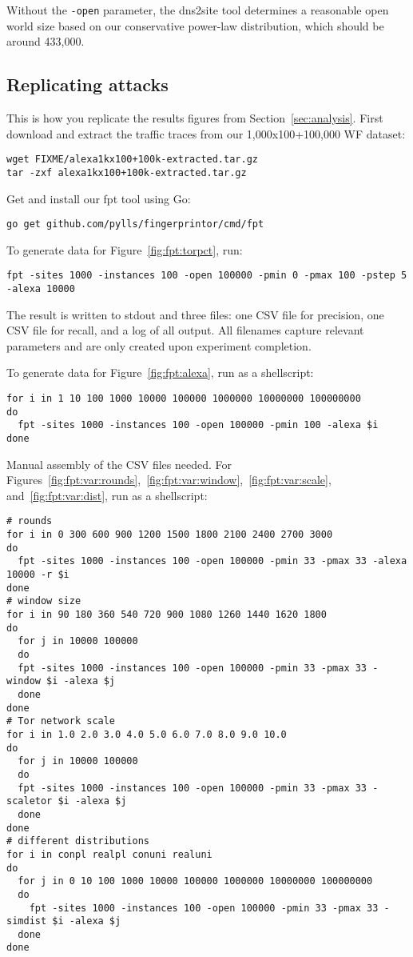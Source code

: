 Without the \texttt{-open} parameter, the dns2site tool determines a reasonable
open world size based on our conservative power-law distribution,
which should be around 433,000.

\subsection{Replicating \name attacks}
This is how you replicate the \name results figures from
Section~\ref{sec:analysis}.
First download and extract the traffic traces from our
1,000x100+100,000 WF dataset:

\begin{lstlisting}
wget FIXME/alexa1kx100+100k-extracted.tar.gz
tar -zxf alexa1kx100+100k-extracted.tar.gz
\end{lstlisting}

Get and install our fpt tool using Go:

\begin{lstlisting}
go get github.com/pylls/fingerprintor/cmd/fpt
\end{lstlisting}

To generate data for Figure~\ref{fig:fpt:torpct}, run:

\begin{lstlisting}
fpt -sites 1000 -instances 100 -open 100000 -pmin 0 -pmax 100 -pstep 5 -alexa 10000
\end{lstlisting}

The result is written to stdout and three files: one CSV file for precision,
one CSV file for recall, and a log of all output. All filenames capture relevant
parameters and are only created upon experiment completion.

To generate data for Figure~\ref{fig:fpt:alexa}, run as a shellscript:

\begin{lstlisting}
for i in 1 10 100 1000 10000 100000 1000000 10000000 100000000
do
  fpt -sites 1000 -instances 100 -open 100000 -pmin 100 -alexa $i
done
\end{lstlisting}

Manual assembly of the CSV files needed. For
Figures~\ref{fig:fpt:var:rounds},~\ref{fig:fpt:var:window},~\ref{fig:fpt:var:scale},
and~\ref{fig:fpt:var:dist}, run
as a shellscript:

\begin{lstlisting}
# rounds
for i in 0 300 600 900 1200 1500 1800 2100 2400 2700 3000
do
  fpt -sites 1000 -instances 100 -open 100000 -pmin 33 -pmax 33 -alexa 10000 -r $i
done
# window size
for i in 90 180 360 540 720 900 1080 1260 1440 1620 1800
do
  for j in 10000 100000
  do
  fpt -sites 1000 -instances 100 -open 100000 -pmin 33 -pmax 33 -window $i -alexa $j
  done
done
# Tor network scale
for i in 1.0 2.0 3.0 4.0 5.0 6.0 7.0 8.0 9.0 10.0
do
  for j in 10000 100000
  do
  fpt -sites 1000 -instances 100 -open 100000 -pmin 33 -pmax 33 -scaletor $i -alexa $j
  done
done
# different distributions
for i in conpl realpl conuni realuni
do
  for j in 0 10 100 1000 10000 100000 1000000 10000000 100000000
  do
    fpt -sites 1000 -instances 100 -open 100000 -pmin 33 -pmax 33 -simdist $i -alexa $j
  done
done
\end{lstlisting}

